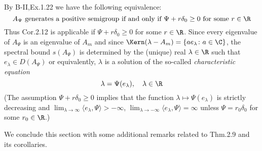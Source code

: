 \begin{example}
\begin{enumerate}[(i), wide]
By B-II,Ex.1.22 we have the following equivalence:
\begin{equation}\label{eq:b3-2.29}
	A_{\Psi} \text{ generates a positive semigroup if and only if } \Psi + r\delta_{0} \geq 0 \text{ for some } r \in \R
\end{equation}
Thus Cor.2.12 is applicable if $\Psi + r\delta_{0} \geq 0$ for some $r \in \R$.
Since every eigenvalue of $A_{\Psi}$ is an eigenvalue of $A_{m}$ and since $\Kern(\lambda-A_{m}) = \{ae_{\lambda} \colon a \in \C\}$, the spectral bound $s(A_{\Psi})$ is determined by the (unique) real $\lambda \in \R$ such that $e_{\lambda} \in D(A_{\Psi})$ or equivalently, $\lambda$ is a solution of the so-called \emph{characteristic equation}
\begin{equation}\label{eq:b3-2.30}
	\lambda = \Psi(e_{\lambda}), \quad \lambda \in \R
\end{equation}
(The assumption $\Psi + r\delta_{0} \geq 0$ implies that the function $\lambda \mapsto \Psi(e_{\lambda})$ is strictly decreasing and $\lim_{\lambda \to \infty}\langle e_{\lambda},\Psi \rangle > -\infty$, $\lim_{\lambda \to -\infty}\langle e_{\lambda},\Psi \rangle = \infty$ unless $\Psi = r_{0}\delta_{0}$ for some $r_{0} \in \R$.)
\end{enumerate}

\end{example}
We conclude this section with some additional remarks related to Thm.2.9 and its corollaries.

